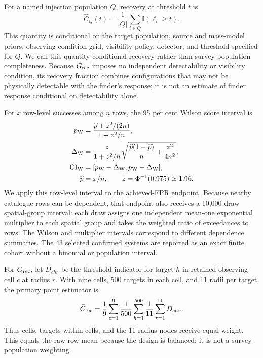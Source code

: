 For a named injection population \(Q\), recovery at threshold \(t\) is
\begin{equation}
 \widehat C_Q(t)
 = \frac{1}{|Q|}\sum_{i\in Q}\mathbb{I}(\ell_i\geq t).
\label{eq:conditional_recovery}
\end{equation}
This quantity is conditional on the target population, source and mass-model
priors, observing-condition grid, visibility policy, detector, and threshold
specified for \(Q\). We call this quantity conditional recovery rather than
survey-population completeness.
Because \(G_{\rm rec}\) imposes no independent detectability or visibility
condition, its recovery fraction combines configurations that may not be
physically detectable with the finder's response; it is not an estimate of
finder response conditional on detectability alone.

For \(x\) row-level successes among \(n\) rows, the 95 per cent Wilson score
interval \citep{Wilson1927} is
\begin{equation}
\begin{aligned}
 p_{\rm W} &=
 \frac{\widehat p+z^2/(2n)}{1+z^2/n},\\
 \Delta_{\rm W} &=
 \frac{z}{1+z^2/n}
 \sqrt{\frac{\widehat p(1-\widehat p)}{n}+\frac{z^2}{4n^2}},
 \\
 {\rm CI}_{\rm W} &= [p_{\rm W}-\Delta_{\rm W},p_{\rm W}+\Delta_{\rm W}],\\
 \widehat p &= x/n,\qquad z=\Phi^{-1}(0.975)\simeq1.96 .
\end{aligned}
\label{eq:wilson_interval}
\end{equation}
We apply this row-level interval to the achieved-FPR endpoint. Because nearby
catalogue rows can be dependent, that endpoint also receives a 10,000-draw
spatial-group interval: each draw assigns one independent mean-one
exponential multiplier to each spatial group and takes the weighted ratio of
exceedances to rows. The Wilson and multiplier intervals correspond to
different dependence summaries. The 43 selected confirmed systems are
reported as an exact finite cohort without a binomial or population interval.

For \(G_{\rm rec}\), let \(D_{chr}\) be the threshold indicator for target
\(h\) in retained observing cell \(c\) at radius \(r\). With nine cells, 500
targets in each cell, and 11 radii per target, the primary point estimator is
\begin{equation}
\widehat C_{\rm rec}
=\frac{1}{9}\sum_{c=1}^{9}\frac{1}{500}\sum_{h=1}^{500}
  \frac{1}{11}\sum_{r=1}^{11}D_{chr}.
\label{eq:grec_balanced_recovery}
\end{equation}
Thus cells, targets within cells, and the 11 radius nodes receive equal
weight. This equals the raw row mean because the design is balanced; it is
not a survey-population weighting.

